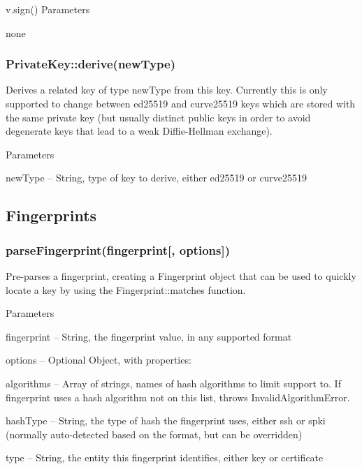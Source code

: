 {\ttfamily v.\+sign()} Parameters


\begin{DoxyItemize}
\item none
\end{DoxyItemize}

\subsubsection*{{\ttfamily Private\+Key\+::derive(new\+Type)}}

Derives a related key of type {\ttfamily new\+Type} from this key. Currently this is only supported to change between {\ttfamily ed25519} and {\ttfamily curve25519} keys which are stored with the same private key (but usually distinct public keys in order to avoid degenerate keys that lead to a weak Diffie-\/\+Hellman exchange).

Parameters


\begin{DoxyItemize}
\item {\ttfamily new\+Type} -- String, type of key to derive, either {\ttfamily ed25519} or {\ttfamily curve25519}
\end{DoxyItemize}

\subsection*{Fingerprints}

\subsubsection*{{\ttfamily parse\+Fingerprint(fingerprint\mbox{[}, options\mbox{]})}}

Pre-\/parses a fingerprint, creating a {\ttfamily Fingerprint} object that can be used to quickly locate a key by using the {\ttfamily Fingerprint\+::matches} function.

Parameters


\begin{DoxyItemize}
\item {\ttfamily fingerprint} -- String, the fingerprint value, in any supported format
\item {\ttfamily options} -- Optional Object, with properties\+:
\begin{DoxyItemize}
\item {\ttfamily algorithms} -- Array of strings, names of hash algorithms to limit support to. If {\ttfamily fingerprint} uses a hash algorithm not on this list, throws {\ttfamily Invalid\+Algorithm\+Error}.
\item {\ttfamily hash\+Type} -- String, the type of hash the fingerprint uses, either {\ttfamily ssh} or {\ttfamily spki} (normally auto-\/detected based on the format, but can be overridden)
\item {\ttfamily type} -- String, the entity this fingerprint identifies, either {\ttfamily key} or {\ttfamily certificate}
\end{DoxyItemize}
\end{DoxyItemize}


